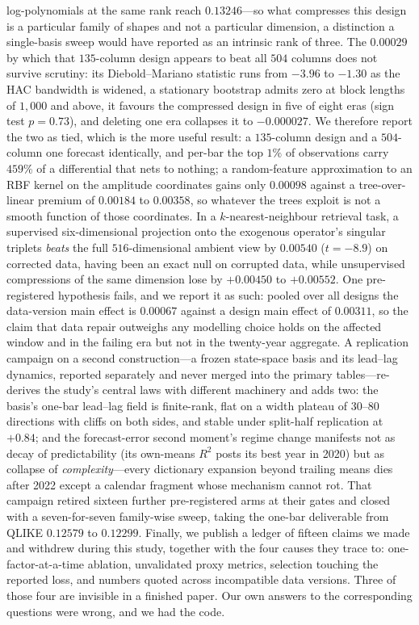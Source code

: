 log-polynomials at the same rank reach $0.13246$---so what compresses this design is a particular family of shapes and not a particular dimension, a distinction a single-basis sweep would have reported as an intrinsic rank of three. The $0.00029$ by which that $135$-column design appears to beat all $504$ columns does not survive scrutiny: its Diebold--Mariano statistic runs from $-3.96$ to $-1.30$ as the HAC bandwidth is widened, a stationary bootstrap admits zero at block lengths of $1{,}000$ and above, it favours the compressed design in five of eight eras (sign test $p = 0.73$), and deleting one era collapses it to $-0.000027$. We therefore report the two as tied, which is the more useful result: a $135$-column design and a $504$-column one forecast identically, and per-bar the top $1\%$ of observations carry $459\%$ of a differential that nets to nothing; a random-feature approximation to an RBF kernel on the amplitude coordinates gains only $0.00098$ against a tree-over-linear premium of $0.00184$ to $0.00358$, so whatever the trees exploit is not a smooth function of those coordinates. In a $k$-nearest-neighbour retrieval task, a supervised six-dimensional projection onto the exogenous operator's singular triplets \emph{beats} the full $516$-dimensional ambient view by $0.00540$ ($t = -8.9$) on corrected data, having been an exact null on corrupted data, while unsupervised compressions of the same dimension lose by $+0.00450$ to $+0.00552$. One pre-registered hypothesis fails, and we report it as such: pooled over all designs the data-version main effect is $0.00067$ against a design main effect of $0.00311$, so the claim that data repair outweighs any modelling choice holds on the affected window and in the failing era but not in the twenty-year aggregate. A replication campaign on a second construction---a frozen state-space basis and its lead--lag dynamics, reported separately and never merged into the primary tables---re-derives the study's central laws with different machinery and adds two: the basis's one-bar lead--lag field is finite-rank, flat on a width plateau of 30--80 directions with cliffs on both sides, and stable under split-half replication at $+0.84$; and the forecast-error second moment's regime change manifests not as decay of predictability (its own-means $R^2$ posts its best year in 2020) but as collapse of \emph{complexity}---every dictionary expansion beyond trailing means dies after 2022 except a calendar fragment whose mechanism cannot rot. That campaign retired sixteen further pre-registered arms at their gates and closed with a seven-for-seven family-wise sweep, taking the one-bar deliverable from QLIKE $0.12579$ to $0.12299$. Finally, we publish a ledger of fifteen claims we made and withdrew during this study, together with the four causes they trace to: one-factor-at-a-time ablation, unvalidated proxy metrics, selection touching the reported loss, and numbers quoted across incompatible data versions. Three of those four are invisible in a finished paper. Our own answers to the corresponding questions were wrong, and we had the code.
